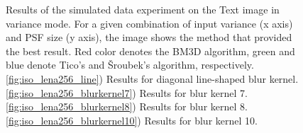 \documentclass[12pt,notitlepage]{report}
\begin{document}
\begin{figure}[h]
  \caption[Simulated-data experiment on the Text image in variance mode]{Results of the simulated data experiment on the Text image in variance mode. For a given combination of input variance (x axis) and PSF size (y axis), the image shows the method that provided the best result. Red color denotes the BM3D algorithm, green and blue denote Tico's and Šroubek's algorithm, respectively. \ref{fig:iso_lena256_line}) Results for diagonal line-shaped blur kernel. \ref{fig:iso_lena256_blurkernel7}) Results for blur kernel 7. \ref{fig:iso_lena256_blurkernel8}) Results for blur kernel 8. \ref{fig:iso_lena256_blurkernel10}) Results for blur kernel 10.}
  \label{fig:var_text256}
\end{figure}

\clearpage
\end{document}
